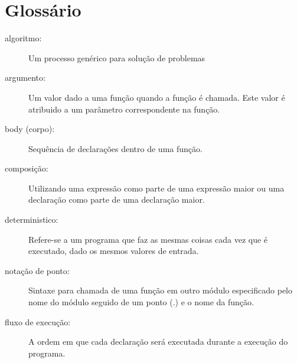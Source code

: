 \section{Glossário}
\begin{description}

\item[algoritmo:] Um processo genérico para solução de problemas

\item[argumento:] Um valor dado a uma função quando a função é chamada.
Este valor é atribuido a um parâmetro correspondente na função.

\item[body (corpo):] Sequência de declarações dentro de uma função.

\item[composição:] Utilizando uma expressão como parte de uma expressão
maior ou uma declaração como parte de uma declaração maior.

\item[deterministico:] Refere-se a um programa que faz as mesmas coisas cada
vez que é executado, dado os mesmos valores de entrada.

\item[notação de ponto:] Sintaxe para chamada de uma função em outro módulo
especificado pelo nome do módulo seguido de um ponto (.) e o nome da função.

\item[fluxo de execução:] A ordem em que cada declaração será executada
durante a execução do programa.


\end{description}
